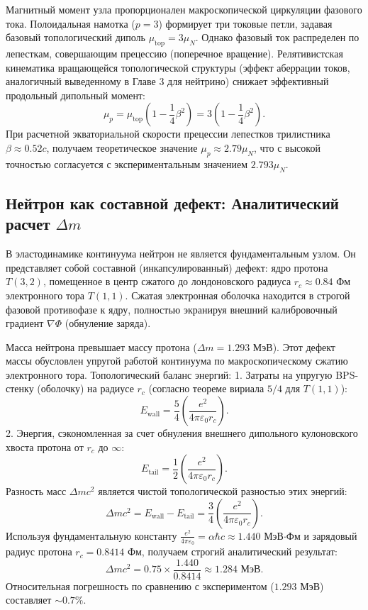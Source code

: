 \documentclass[11pt,a4paper]{article}
\begin{document}
Магнитный момент узла пропорционален макроскопической циркуляции фазового тока. Полоидальная намотка ($p=3$) формирует три токовые петли, задавая базовый топологический диполь $\mu_{\text{top}} = 3 \mu_N$.
Однако фазовый ток распределен по лепесткам, совершающим прецессию (поперечное вращение). Релятивистская кинематика вращающейся топологической структуры (эффект аберрации токов, аналогичный выведенному в Главе 3 для нейтрино) снижает эффективный продольный дипольный момент:
\begin{equation}
\mu_p = \mu_{\text{top}} \left(1 - \frac{1}{4}\beta^2\right) = 3 \left(1 - \frac{1}{4}\beta^2\right).
\end{equation}
При расчетной экваториальной скорости прецессии лепестков трилистника $\beta \approx 0.52 c$, получаем теоретическое значение $\mu_p \approx 2.79 \mu_N$, что с высокой точностью согласуется с экспериментальным значением $2.793 \mu_N$.

\subsection{Нейтрон как составной дефект: Аналитический расчет $\Delta m$}
В эластодинамике континуума нейтрон не является фундаментальным узлом. Он представляет собой составной (инкапсулированный) дефект: ядро протона $T(3,2)$, помещенное в центр сжатого до лондоновского радиуса $r_c \approx 0.84$ Фм электронного тора $T(1,1)$. Сжатая электронная оболочка находится в строгой фазовой противофазе к ядру, полностью экранируя внешний калибровочный градиент $\nabla \Phi$ (обнуление заряда).

Масса нейтрона превышает массу протона ($\Delta m = 1.293$ МэВ). Этот дефект массы обусловлен упругой работой континуума по макроскопическому сжатию электронного тора. Топологический баланс энергий:
1. Затраты на упругую BPS-стенку (оболочку) на радиусе $r_c$ (согласно теореме вириала $5/4$ для $T(1,1)$):
\begin{equation}
E_{\text{wall}} = \frac{5}{4} \left( \frac{e^2}{4\pi\varepsilon_0 r_c} \right).
\end{equation}
2. Энергия, сэкономленная за счет обнуления внешнего дипольного кулоновского хвоста протона от $r_c$ до $\infty$:
\begin{equation}
E_{\text{tail}} = \frac{1}{2} \left( \frac{e^2}{4\pi\varepsilon_0 r_c} \right).
\end{equation}
Разность масс $\Delta m c^2$ является чистой топологической разностью этих энергий:
\begin{equation}
\Delta m c^2 = E_{\text{wall}} - E_{\text{tail}} = \frac{3}{4} \left( \frac{e^2}{4\pi\varepsilon_0 r_c} \right).
\end{equation}
Используя фундаментальную константу $\frac{e^2}{4\pi\varepsilon_0} = \alpha \hbar c \approx 1.440$ МэВ$\cdot$Фм и зарядовый радиус протона $r_c = 0.8414$ Фм, получаем строгий аналитический результат:
\begin{equation}
\Delta m c^2 = 0.75 \times \frac{1.440}{0.8414} \approx 1.284 \text{ МэВ}.
\end{equation}
Относительная погрешность по сравнению с экспериментом ($1.293$ МэВ) составляет $\sim 0.7\%$.
\end{document}
